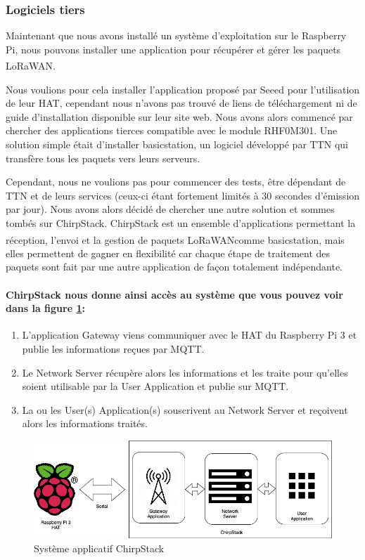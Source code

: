 \documentclass{article}
\begin{document}
			\subsubsection{Logiciels tiers}
				Maintenant que nous avons installé un système d'exploitation sur le Raspberry Pi, nous pouvons installer une application pour récupérer et gérer les paquets LoRaWAN\textsuperscript\textregistered.
				
				Nous voulions pour cela installer l'application proposé par Seeed pour l'utilisation de leur HAT, cependant nous n'avons pas trouvé de liens de téléchargement ni de guide d'installation disponible sur leur site web. 
				Nous avons alors commencé par chercher des applications tierces compatible avec le module RHF0M301. Une solution simple était d'installer basicstation, un logiciel développé par TTN qui transfère tous les paquets vers leurs serveurs.
				
				Cependant, nous ne voulions pas pour commencer des tests, être dépendant de TTN et de leurs services (ceux-ci étant fortement limités à 30 secondes d'émission par jour).
				Nous avons alors décidé de chercher une autre solution et sommes tombés sur ChirpStack. ChirpStack est un ensemble d'applications permettant la réception, l'envoi et la gestion de paquets LoRaWAN\textsuperscript\textregistered comme basicstation, mais elles permettent de gagner en flexibilité car chaque étape de traitement des paquets sont fait par une autre application de façon totalement indépendante.
				
				\paragraph{ChirpStack nous donne ainsi accès au système que vous pouvez voir dans la figure \ref{fig:systemechirpstack}:}
				\begin{enumerate}
					\item L'application Gateway viens communiquer avec le HAT du Raspberry Pi 3 et publie les informations reçues par MQTT.
					\item Le Network Server récupère alors les informations et les traite pour qu'elles soient utilisable par la User Application et publie sur MQTT.
					\item La ou les User(s) Application(s) souscrivent au Network Server et reçoivent alors les informations traités.
				\end{enumerate}

				\begin{figure}[H]
					\centering
					\includegraphics[width=0.7\linewidth]{Systeme_ChirpStack}
					\caption{Système applicatif ChirpStack}
					\label{fig:systemechirpstack}
				\end{figure}
				
\end{document}
